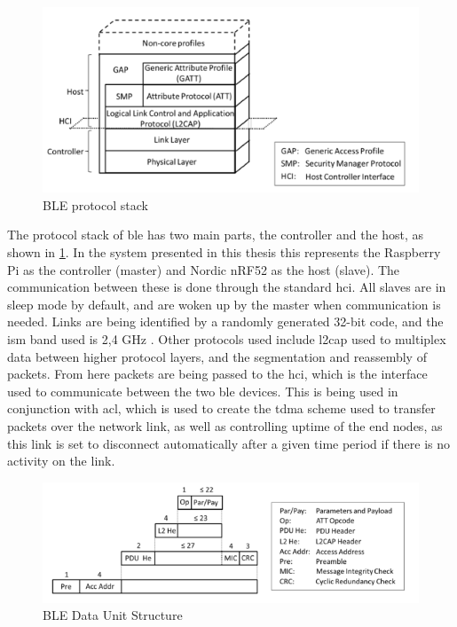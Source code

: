 \begin{figure}[ht]
    \centering
    \includegraphics[scale=0.7]{BLEprotocolStack.png}    
    \caption{BLE protocol stack}
    \label{fig:BLEprotocolStack}
\end{figure}

The protocol stack of \gls{ble} has two main parts, the controller and the host, as shown in \ref{fig:BLEprotocolStack}. In the system presented in this thesis this represents the Raspberry Pi as the controller (master) and Nordic nRF52 as the host (slave). The communication between these is done through the standard \gls{hci}. All slaves are in sleep mode by default, and are woken up by the master when communication is needed. Links are being identified by a randomly generated 32-bit code, and the \gls{ism} band used is 2,4 GHz \cite{gomez2012overview}. Other protocols used include \gls{l2cap} used to multiplex data between higher protocol layers, and the segmentation and reassembly of packets. From here packets are being passed to the \gls{hci}, which is the interface used to communicate between the two \gls{ble} devices. This is being used in conjunction with \gls{acl}, which is used to create the \gls{tdma} scheme used to transfer packets over the network link, as well as controlling uptime of the end nodes, as this link is set to disconnect automatically after a given time period if there is no activity on the link. 



\begin{figure}[ht]
    \centering
    \includegraphics[scale=0.7]{BLEdataUnitStructure.png}    
    \caption{BLE Data Unit Structure}
    \label{fig:BLEdataUnitStructure}
\end{figure}

